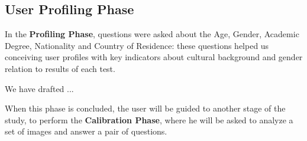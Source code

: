 \subsection{User Profiling Phase}
\label{subsec:design_profiling}
%
In the \textbf{Profiling Phase}, questions were asked about the Age, Gender, Academic Degree, Nationality and Country of Residence: these
questions helped us conceiving user profiles with key indicators about cultural background and gender relation to results of each test. \par
%
We have drafted ... \par
%
When this phase is concluded, the user will be guided to another stage of the study, to perform the \textbf{Calibration Phase}, where he will be asked to analyze a set of images and answer a pair of questions. \par
%
